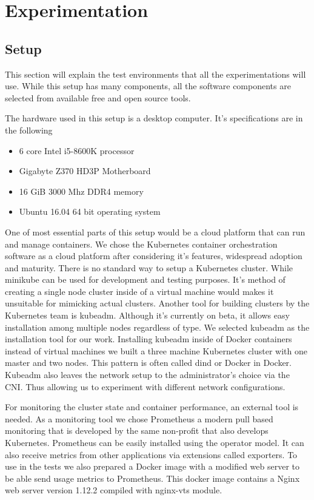 \documentclass[12pt,oneandhalf,chaparabic,ceng,ms,eng,oneside,pntc]{gsufbe}
\begin{document}

\chapter{Experimentation}
\section{Setup}
This section will explain the test environments that all the experimentations will use.  While this
setup has many components, all the software components are selected from available free and open source
tools.

The hardware used in this setup is a desktop computer.  It's specifications are in the following
\begin{itemize}
 \item 6 core Intel i5-8600K processor
 \item Gigabyte Z370 HD3P Motherboard
 \item 16 GiB 3000 Mhz DDR4 memory
 \item Ubuntu 16.04 64 bit operating system
\end{itemize}

One of most essential parts of this setup would be a cloud platform that can run and manage containers.
We chose the Kubernetes container orchestration software as a cloud platform after considering it's
features, widespread adoption and maturity.  There is no standard way to setup a Kubernetes cluster.
While minikube can be used for development and testing purposes.  It's method of creating a single node
cluster inside of a virtual machine would makes it unsuitable for mimicking actual clusters.  Another
tool for building clusters by the Kubernetes team is kubeadm.  Although it's currently on beta, it
allows easy installation among multiple nodes regardless of type.  We selected kubeadm as the 
installation tool for our work.  Installing kubeadm inside of Docker containers instead of virtual
machines we built a three machine Kubernetes cluster with one master and two nodes.  This pattern is
often called dind or Docker in Docker.  Kubeadm also leaves the network setup to the administrator's
choice via the CNI.  Thus allowing us to experiment with different network configurations.

For monitoring the cluster state and container performance, an external tool is needed.  As a monitoring
tool we chose Prometheus a modern pull based monitoring that is developed by the same non-profit that
also develops Kubernetes.  Prometheus can be easily installed using the operator model.  It can also
receive metrics from other applications via extensions called exporters.  To use in the tests we also 
prepared a Docker image with a modified web server to be able send usage metrics to Prometheus.  This
docker image contains a Nginx web server version 1.12.2 compiled with nginx-vts module.
\end{document}
